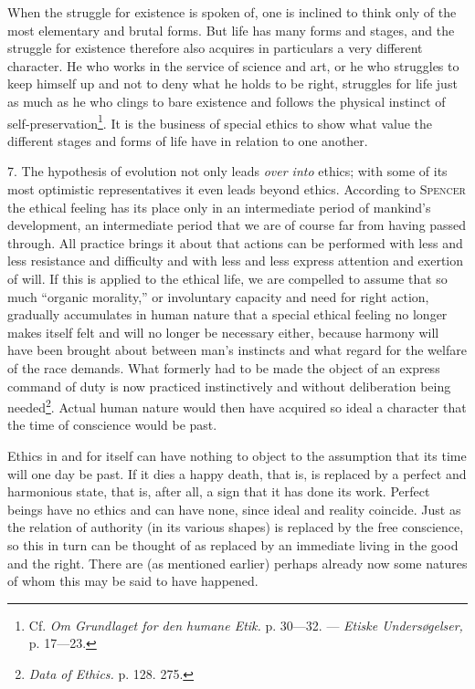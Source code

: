 \documentclass[12pt,a4paper,openany]{book}
\newcommand{\opage}[1]{\marginnote{\footnotesize\textit{[#1]}}}
\begin{document}
When the struggle for existence is spoken of, one is inclined to think only of the most elementary and
brutal forms. But life has many forms and stages, and the struggle for existence therefore also acquires
in particulars a very different character. He who works in the service of science and art, or he who
struggles to keep himself up and not to deny what he holds to be right, struggles for life just as much
as he who clings to bare existence and follows the physical instinct of
self-preservation\footnote[1]{Cf. \textit{Om Grundlaget for den humane Etik.} p. 30---32. ---
\textit{Etiske Undersøgelser,} p. 17---23.}. It is the business of special ethics to show what value the
different stages and forms of life have in relation to one another.

7. The hypothesis of evolution not only leads \textit{over into} ethics; with some of its most optimistic
representatives it even leads
\opage{103}beyond ethics. According to \textsc{Spencer} the ethical feeling has its place only in an intermediate
period of mankind's development, an intermediate period that we are of course far from having passed
through. All practice brings it about that actions can be performed with less and less resistance and
difficulty and with less and less express attention and exertion of will. If this is applied to the
ethical life, we are compelled to assume that so much ``organic morality,'' or involuntary capacity and
need for right action, gradually accumulates in human nature that a special ethical feeling no longer
makes itself felt and will no longer be necessary either, because harmony will have been brought about
between man's instincts and what regard for the welfare of the race demands. What formerly had to be
made the object of an express command of duty is now practiced instinctively and without deliberation
being needed\footnote[1]{\textit{Data of Ethics.} p. 128. 275.}. Actual human nature would then have
acquired so ideal a character that the time of conscience would be past.

Ethics in and for itself can have nothing to object to the assumption that its time will one day be
past. If it dies a happy death, that is, is replaced by a perfect and harmonious state, that is, after
all, a sign that it has done its work. Perfect beings have no ethics and can have none, since ideal and
reality coincide. Just as the relation of authority (in its various shapes) is replaced by the free
conscience, so this in turn can be thought of as replaced by an immediate living in the good and the
right. There are (as mentioned earlier) perhaps already now some natures of whom this may be said to
have happened.
\end{document}
